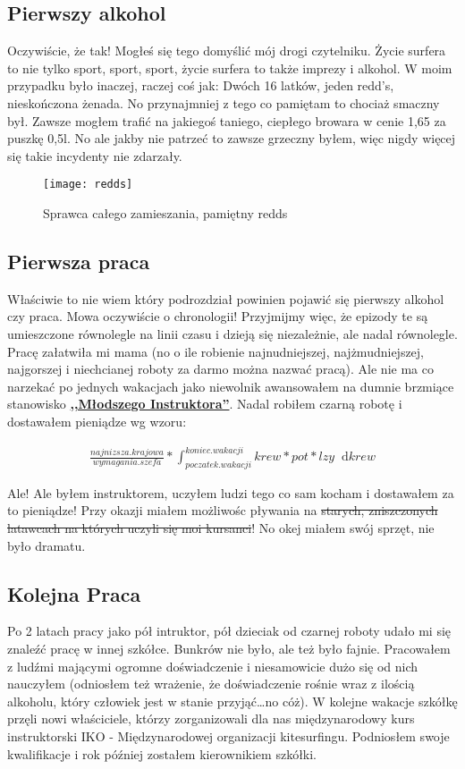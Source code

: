 \documentclass{article}
\begin{document}
	\subsection{Pierwszy alkohol}	
			
		Oczywiście, że tak! Mogłeś się tego domyślić mój drogi czytelniku. Życie surfera to nie tylko sport, sport, sport, życie surfera to także imprezy i alkohol. W moim przypadku było inaczej, raczej coś jak: Dwóch 16 latków, jeden redd's, nieskończona żenada. No przynajmniej z tego co pamiętam to chociaż smaczny był. Zawsze mogłem trafić na jakiegoś taniego, ciepłego browara w cenie 1,65 za puszkę 0,5l. No ale jakby nie patrzeć to zawsze grzeczny byłem, więc nigdy więcej się takie incydenty nie zdarzały.
		
		\begin{figure}[h]
			\centering
			\texttt{[image: redds]}
			\caption{Sprawca całego zamieszania, pamiętny redds}
		\end{figure}
		
	\subsection{Pierwsza praca}
	
	Właściwie to nie wiem który podrozdział powinien pojawić się pierwszy alkohol czy praca. Mowa oczywiście o chronologii! Przyjmijmy więc, że epizody te są umieszczone równolegle na linii czasu i dzieją się niezależnie, ale nadal równolegle. Pracę załatwiła mi mama (no o ile robienie najnudniejszej, najżmudniejszej, najgorszej i niechcianej roboty za darmo można nazwać pracą). Ale nie ma co narzekać po jednych wakacjach jako niewolnik awansowałem na dumnie brzmiące stanowisko \textbf{\uline{,,Młodszego Instruktora''}}. Nadal robiłem czarną robotę i dostawałem pieniądze wg wzoru: 
	
	\begin{eqnarray}
		\frac{najnizsza.krajowa}{wymagania.szefa}*\int_{poczatek.wakacji}^{koniec.wakacji}{krew*pot*lzy \; \; \mathrm{d} krew}
	\end{eqnarray}
	
	Ale! Ale byłem instruktorem, uczyłem ludzi tego co sam kocham i dostawałem za to pieniądze! Przy okazji miałem możliwośc pływania na \sout{starych, zniszczonych latawcach na których uczyli się moi kursanci}! No okej miałem swój sprzęt, nie było dramatu.
	
	\subsection{Kolejna Praca}
	Po 2 latach pracy jako pół intruktor, pół dzieciak od czarnej roboty udało mi się znaleźć pracę w innej szkółce. Bunkrów nie było, ale też było fajnie. Pracowałem z ludźmi mającymi ogromne doświadczenie i niesamowicie dużo się od nich nauczyłem (odniosłem też wrażenie, że doświadczenie rośnie wraz z ilością alkoholu, który człowiek jest w stanie przyjąć\dots \space no cóż). W kolejne wakacje szkółkę przęli nowi właściciele, którzy zorganizowali dla nas międzynarodowy kurs instruktorski IKO - Międzynarodowej organizacji kitesurfingu. Podniosłem swoje kwalifikacje i rok później zostałem kierownikiem szkółki.
	
\end{document}
